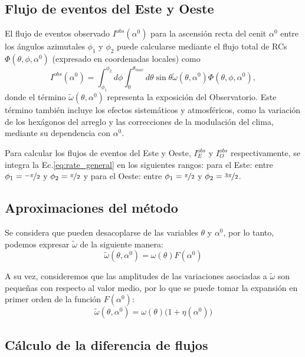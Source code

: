     \subsection{Flujo de eventos del Este y Oeste}
    El flujo de eventos observado $I^{obs}(\alpha^0)$ para la ascensión recta del cenit $\alpha^0$ entre los ángulos azimutales $\phi_1$ y $\phi_2$ puede calcularse mediante el flujo total de RCs $\Phi(\theta, \phi, \alpha^0)$ (expresado en coordenadas locales) como
    \begin{equation}
        I^{obs}(\alpha^0) = \int_{\phi_1}^{\phi_2} d\phi \int_{0}^{\theta_{max}} d\theta \sin\theta \tilde{\omega}(\theta, \alpha^0) \Phi(\theta, \phi, \alpha^0),
        \label{eq:rate_general}
    \end{equation}
    \noindent  donde  el término $\tilde{\omega}(\theta, \alpha^0)$ representa la exposición del Observatorio. Este término también incluye los efectos sistemáticos y atmosféricos, como la variación de los hexágonos del arreglo y las correcciones de la modulación del clima, mediante  su dependencia con $\alpha^0$.

    Para calcular los flujos de eventos del Este y Oeste, $I^{obs}_E$ y $I_O^{obs}$ respectivamente, se integra la Ec.\ref{eq:rate_general} en los siguientes  rangos: para el Este: entre $\phi_1=\nicefrac{-\pi}{2}$ y $\phi_2=\nicefrac{\pi}{2}$ y para el Oeste: entre $\phi_1=\nicefrac{\pi}{2}$ y $\phi_2=\nicefrac{3\pi}{2}$.

    \subsection{Aproximaciones del método}
    Se considera que pueden  desacoplarse de las variables $\theta$ y $\alpha^0$, por lo tanto, podemos expresar $\tilde{\omega}$ de la siguiente manera:
    \begin{equation}
        \tilde{\omega}(\theta, \alpha^0) = \omega(\theta)F(\alpha^0)
    \end{equation}    
    
    A su vez, consideremos que las amplitudes de las variaciones asociadas a $\tilde{\omega}$ son pequeñas con respecto al valor medio, por lo que se puede tomar la expansión en primer orden de la función $F(\alpha^0)$:
    \begin{equation}
        \tilde{\omega}(\theta, \alpha^0) = \omega(\theta)\big(1 + \eta(\alpha^0) \big)
        \label{eq:omega_expandido}
    \end{equation}
    \subsection{Cálculo de la diferencia de flujos}
  
